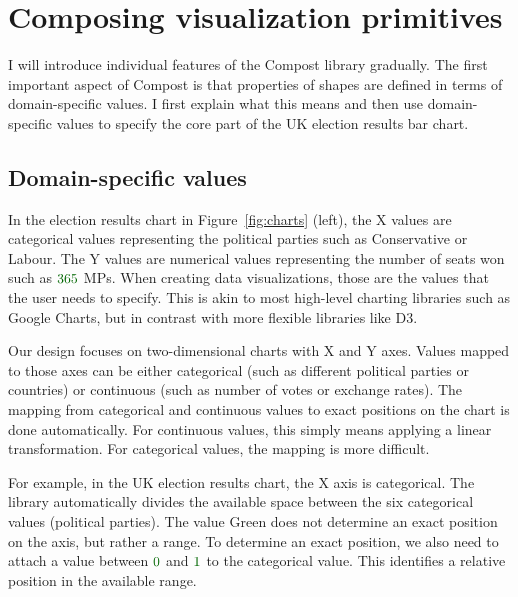 \documentclass{jfp}
\newcommand{\num}[1]{\textcolor{numclr}{#1}}
\newcommand{\strf}[1]{\textnormal{\textcolor{strclr}{\sffamily #1}}}
\begin{document}
\section{Composing visualization primitives}
I will introduce individual features of the Compost library gradually. The first important aspect of
Compost is that properties of shapes are defined in terms of domain-specific values. I first
explain what this means and then use domain-specific values to specify the core part of the
UK election results bar chart.

\subsection{Domain-specific values}

In the election results chart in Figure~\ref{fig:charts} (left), the X values are categorical
values representing the political parties such as \strf{Conservative} or \strf{Labour}. The
Y values are numerical values representing the number of seats won such as $\num{365}$ MPs.
When creating data visualizations, those are the values that the user needs to specify. This is
akin to most high-level charting libraries such as Google Charts, but in contrast with more
flexible libraries like D3.

Our design focuses on two-dimensional charts with X and Y axes. Values mapped to those axes
can be either categorical (such as different political parties or countries) or continuous
(such as number of votes or exchange rates). The mapping from categorical and continuous values
to exact positions on the chart is done automatically. For continuous values, this simply means
applying a linear transformation. For categorical values, the mapping is more difficult.

For example, in the UK election results chart, the X axis is categorical. The library automatically
divides the available space between the six categorical values (political parties). The value
\strf{Green} does not determine an exact position on the axis, but rather a range. To determine
an exact position, we also need to attach a value between $\num{0}$ and $\num{1}$ to the
categorical value. This identifies a relative position in the available range.
\end{document}
